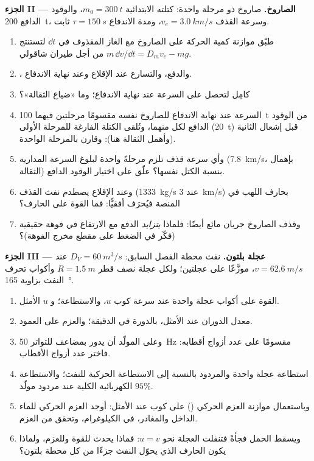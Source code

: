 \begin{problem}
\medskip
\noindent\textbf{الجزء II --- الصاروخ.}
صاروخ ذو مرحلة واحدة: كتلته الابتدائية $m_0 = \qty{300}{t}$، والوقود الدافع
\qty{200}{t}، وسرعة القذف $v_e = \qty{3.0}{km/s}$، ومدة الاندفاع $\tau =
\qty{150}{s}$  ثابت.
\begin{enumerate}[resume]
  \item طبّق موازنة كمية الحركة على الصاروخ مع الغاز المقذوف في
        $\dd t$ لتستنتج $m\,\dd v/\dd t = D_mv_e - mg$ من أجل طيران
        شاقولي.
  \item {}، والدفع، والتسارع عند الإقلاع وعند نهاية
        الاندفاع.
  \item كامِل لتحصل على السرعة عند نهاية الاندفاع؛ وما «ضياع
        الثقالة»؟
  \item السرعة عند نهاية الاندفاع للصاروخ نفسه مقسومًا مرحلتين
        فيهما \qty{100}{t} من الوقود الدافع لكل منهما، وتُلقى الكتلة
        الفارغة للمرحلة الأولى (\qty{20}{t}) قبل إشعال الثانية (وأهمل
        الثقالة هنا): وقارن بالمرحلة الواحدة.
  \item وأي سرعة قذف تلزم مرحلةً واحدة لبلوغ السرعة المدارية
        (\qty{7.8}{km/s}، بإهمال الثقالة) بنسبة الكتل نفسها؟ علّق على
        اختيار الوقود الدافع.
  \item وعند الإقلاع يصطدم نفث القذف (\qty{1333}{kg/s} عند \qty{3}{km/s})
        بحارف اللهب في المنصة فيُحرَف أفقيًّا:
        فما القوة على الحارف؟
  \item وقذف الصاروخ جريان مائع أيضًا: فلماذا \emph{يتزايد} الدفع
        مع الارتفاع في فوهة حقيقية (فكّر في الضغط على مقطع مخرج
        الفوهة)؟
\end{enumerate}

\medskip
\noindent\textbf{الجزء III --- عجلة بلتون.}
نفث محطة الفصل السابق: $D_V = \qty{60}{m^3/s}$ عند $v =
\qty{62.6}{m/s}$، موزَّعًا على عجلتين؛ ولكل عجلة نصف قطر $R =
\qty{1.5}{m}$ وأكواب تحرف النفث بزاوية \qty{165}{\degree}.
\begin{enumerate}[resume]
  \item القوة على أكواب عجلة واحدة عند سرعة كوب $u$، والاستطاعة؛
        و $u$ الأمثل.
  \item معدل الدوران عند الأمثل، بالدورة في الدقيقة؛ والعزم على العمود.
  \item وعلى المولّد أن يدور بمضاعف للتواتر \qty{50}{Hz} مقسومًا على
        عدد أزواج أقطابه: فاختر عدد أزواج الأقطاب.
  \item استطاعة عجلة واحدة والمردود بالنسبة إلى الاستطاعة
        الحركية للنفث؛ والاستطاعة الكهربائية الكلية عند مردود
        مولّد $95\%$.
  \item وباستعمال موازنة العزم الحركي ()
        على كوب عند الأمثل: أوجد العزم الحركي للماء الداخل
        والمغادر، في الكيلوغرام، وتحقق من العزم.
  \item ويسقط الحمل فجأةً فتنفلت العجلة نحو $u =
        v$: فماذا يحدث للقوة وللعزم، ولماذا يكون الحارف الذي يحوّل
        النفث جزءًا من كل محطة بلتون؟
\end{enumerate}


\end{problem}
